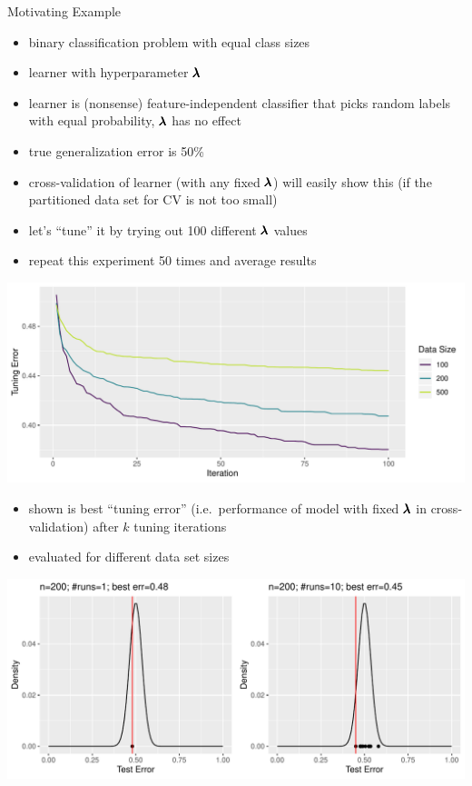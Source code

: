     \begin{frame}[c,allowframebreaks]{Motivating Example}
    \begin{itemize}
        \item binary classification problem with equal class sizes
        \item learner with hyperparameter $\pmb{\lambda}$
        \item learner is (nonsense) feature-independent classifier that picks
            random labels with equal probability,
              $\pmb{\lambda}$ has no effect
        \item true generalization error is 50\%
        \item cross-validation of learner (with any fixed $\pmb{\lambda}$) will easily show this
          (if the partitioned data set for CV is not too small)
        \item let's ``tune'' it by trying out 100 different $\pmb{\lambda}$ values
        \item repeat this experiment 50 times and average results
    \end{itemize}

    \framebreak

    \begin{center}
        \includegraphics[height=.5\textheight]{images/example-nested-resampling}
    \end{center}

    \begin{itemize}
    \item shown is best ``tuning error'' (i.e.\ performance of model with fixed $\pmb{\lambda}$ in cross-validation) after $k$ tuning iterations
    \item evaluated for different data set sizes
    \end{itemize}

    \begin{center}
        \includegraphics[height=.6\textheight]{images/dist-tuning1}
    \end{center}


\end{frame}
